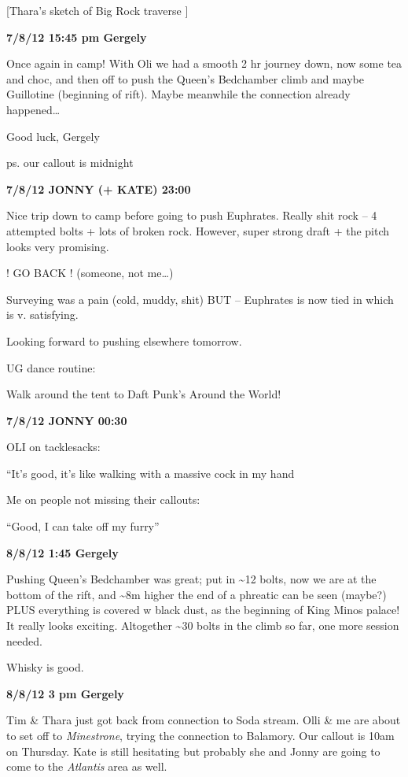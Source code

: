 {[}Thara's sketch of Big Rock traverse {]}

\textbf{7/8/12 15:45 pm Gergely}

Once again in camp! With Oli we had a smooth 2 hr journey down, now some
tea and choc, and then off to push the Queen's Bedchamber climb and
maybe Guillotine (beginning of rift). Maybe meanwhile the connection
already happened\ldots{}

Good luck, Gergely

ps. our callout is midnight

\textbf{7/8/12 JONNY (+ KATE) 23:00}

Nice trip down to camp before going to push Euphrates. Really shit rock
-- 4 attempted bolts + lots of broken rock. However, super strong draft
+ the pitch looks very promising.

! GO BACK ! (someone, not me\ldots{})

Surveying was a pain (cold, muddy, shit) BUT -- Euphrates is now tied in
which is v. satisfying.

Looking forward to pushing elsewhere tomorrow.

UG dance routine:

Walk around the tent to Daft Punk's Around the World!

\textbf{7/8/12 JONNY 00:30}

OLI on tacklesacks:

``It's good, it's like walking with a massive cock in my hand

Me on people not missing their callouts:

``Good, I can take off my furry''

\textbf{8/8/12 1:45 Gergely}

Pushing Queen's Bedchamber was great; put in \textasciitilde{}12 bolts,
now we are at the bottom of the rift, and \textasciitilde{}8m higher the
end of a phreatic can be seen (maybe?) PLUS everything is covered w
black dust, as the beginning of King Minos palace! It really looks
exciting. Altogether \textasciitilde{}30 bolts in the climb so far, one
more session needed.

Whisky is good.

\textbf{8/8/12 3 pm Gergely}

Tim \& Thara just got back from connection to Soda stream. Olli \& me
are about to set off to \emph{Minestrone}, trying the connection to
Balamory. Our callout is 10am on Thursday. Kate is still hesitating but
probably she and Jonny are going to come to the \emph{Atlantis} area as
well.

